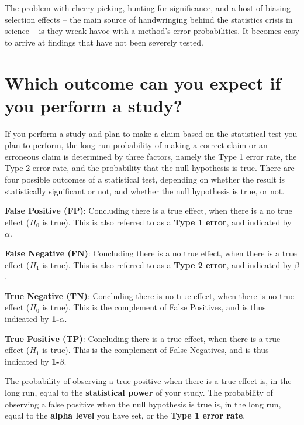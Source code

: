 \documentclass[
  oneside]{krantz}
\renewenvironment{quote}{\begin{VF}}{\end{VF}}
\begin{document}
\begin{quote}
The problem with cherry picking, hunting for significance, and a host of biasing selection effects -- the main source of handwringing behind the statistics crisis in science -- is they wreak havoc with a method's error probabilities. It becomes easy to arrive at findings that have not been severely tested.
\end{quote}

\hypertarget{which-outcome-can-you-expect-if-you-perform-a-study}{%
\section{Which outcome can you expect if you perform a study?}\label{which-outcome-can-you-expect-if-you-perform-a-study}}

If you perform a study and plan to make a claim based on the statistical test you plan to perform, the long run probability of making a correct claim or an erroneous claim is determined by three factors, namely the Type 1 error rate, the Type 2 error rate, and the probability that the null hypothesis is true. There are four possible outcomes of a statistical test, depending on whether the result is statistically significant or not, and whether the null hypothesis is true, or not.

\textbf{False Positive (FP)}: Concluding there is a true effect, when there is a no true effect (\(H_0\) is true). This is also referred to as a \textbf{Type 1 error}, and indicated by \textbf{\(\alpha\)}.

\textbf{False Negative (FN)}: Concluding there is a no true effect, when there is a true effect (\(H_1\) is true). This is also referred to as a \textbf{Type 2 error}, and indicated by \textbf{\(\beta\)}.

\textbf{True Negative (TN)}: Concluding there is no true effect, when there is no true effect (\(H_0\) is true). This is the complement of False Positives, and is thus indicated by \textbf{1-\(\alpha\)}.

\textbf{True Positive (TP)}: Concluding there is a true effect, when there is a true effect (\(H_1\) is true). This is the complement of False Negatives, and is thus indicated by \textbf{1-\(\beta\)}.

The probability of observing a true positive when there is a true effect is, in the long run, equal to the \textbf{statistical power} of your study. The probability of observing a false positive when the null hypothesis is true is, in the long run, equal to the \textbf{alpha level} you have set, or the \textbf{Type 1 error rate}.
\end{document}
